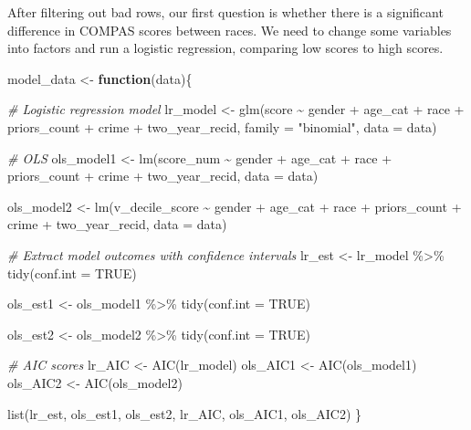 \documentclass[
]{book}
\newenvironment{Shaded}{\begin{snugshade}}{\end{snugshade}}
\newcommand{\AttributeTok}[1]{\textcolor[rgb]{0.77,0.63,0.00}{#1}}
\newcommand{\CommentTok}[1]{\textcolor[rgb]{0.56,0.35,0.01}{\textit{#1}}}
\newcommand{\ConstantTok}[1]{\textcolor[rgb]{0.00,0.00,0.00}{#1}}
\newcommand{\ControlFlowTok}[1]{\textcolor[rgb]{0.13,0.29,0.53}{\textbf{#1}}}
\newcommand{\FunctionTok}[1]{\textcolor[rgb]{0.00,0.00,0.00}{#1}}
\newcommand{\NormalTok}[1]{#1}
\newcommand{\OtherTok}[1]{\textcolor[rgb]{0.56,0.35,0.01}{#1}}
\newcommand{\SpecialCharTok}[1]{\textcolor[rgb]{0.00,0.00,0.00}{#1}}
\newcommand{\StringTok}[1]{\textcolor[rgb]{0.31,0.60,0.02}{#1}}
\begin{document}
After filtering out bad rows, our first question is whether there is a significant difference in COMPAS scores between races. We need to change some variables into factors and run a logistic regression, comparing low scores to high scores.

\begin{Shaded}
\begin{Highlighting}[]
\NormalTok{model\_data }\OtherTok{\textless{}{-}} \ControlFlowTok{function}\NormalTok{(data)\{}

\CommentTok{\# Logistic regression model}
\NormalTok{lr\_model }\OtherTok{\textless{}{-}} \FunctionTok{glm}\NormalTok{(score }\SpecialCharTok{\textasciitilde{}}\NormalTok{ gender }\SpecialCharTok{+}\NormalTok{ age\_cat }\SpecialCharTok{+}\NormalTok{ race }\SpecialCharTok{+}\NormalTok{ priors\_count }\SpecialCharTok{+}\NormalTok{ crime }\SpecialCharTok{+}\NormalTok{ two\_year\_recid, }
             \AttributeTok{family =} \StringTok{"binomial"}\NormalTok{, }\AttributeTok{data =}\NormalTok{ data)}

\CommentTok{\# OLS}
\NormalTok{ols\_model1 }\OtherTok{\textless{}{-}} \FunctionTok{lm}\NormalTok{(score\_num }\SpecialCharTok{\textasciitilde{}}\NormalTok{ gender }\SpecialCharTok{+}\NormalTok{ age\_cat }\SpecialCharTok{+}\NormalTok{ race }\SpecialCharTok{+}\NormalTok{ priors\_count }\SpecialCharTok{+}\NormalTok{ crime }\SpecialCharTok{+}\NormalTok{ two\_year\_recid, }
             \AttributeTok{data =}\NormalTok{ data)}

\NormalTok{ols\_model2 }\OtherTok{\textless{}{-}} \FunctionTok{lm}\NormalTok{(v\_decile\_score }\SpecialCharTok{\textasciitilde{}}\NormalTok{ gender }\SpecialCharTok{+}\NormalTok{ age\_cat }\SpecialCharTok{+}\NormalTok{ race }\SpecialCharTok{+}\NormalTok{ priors\_count }\SpecialCharTok{+}\NormalTok{ crime }\SpecialCharTok{+}\NormalTok{ two\_year\_recid, }
             \AttributeTok{data =}\NormalTok{ data)}

\CommentTok{\# Extract model outcomes with confidence intervals }
\NormalTok{lr\_est }\OtherTok{\textless{}{-}}\NormalTok{ lr\_model }\SpecialCharTok{\%\textgreater{}\%} 
    \FunctionTok{tidy}\NormalTok{(}\AttributeTok{conf.int =} \ConstantTok{TRUE}\NormalTok{) }

\NormalTok{ols\_est1 }\OtherTok{\textless{}{-}}\NormalTok{ ols\_model1 }\SpecialCharTok{\%\textgreater{}\%}
    \FunctionTok{tidy}\NormalTok{(}\AttributeTok{conf.int =} \ConstantTok{TRUE}\NormalTok{) }

\NormalTok{ols\_est2 }\OtherTok{\textless{}{-}}\NormalTok{ ols\_model2 }\SpecialCharTok{\%\textgreater{}\%}
    \FunctionTok{tidy}\NormalTok{(}\AttributeTok{conf.int =} \ConstantTok{TRUE}\NormalTok{) }

\CommentTok{\# AIC scores }
\NormalTok{lr\_AIC }\OtherTok{\textless{}{-}} \FunctionTok{AIC}\NormalTok{(lr\_model)}
\NormalTok{ols\_AIC1 }\OtherTok{\textless{}{-}} \FunctionTok{AIC}\NormalTok{(ols\_model1)}
\NormalTok{ols\_AIC2 }\OtherTok{\textless{}{-}} \FunctionTok{AIC}\NormalTok{(ols\_model2)}
    
\FunctionTok{list}\NormalTok{(lr\_est, ols\_est1, ols\_est2, lr\_AIC, ols\_AIC1, ols\_AIC2)}
\NormalTok{\}}
\end{Highlighting}
\end{Shaded}
\end{document}
